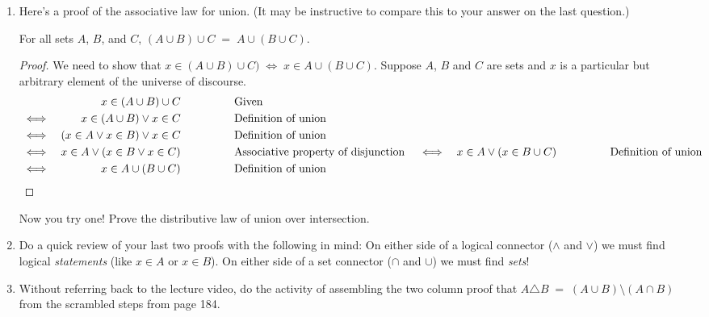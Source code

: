 \documentclass{amsart}
\begin{document}
\begin{enumerate}
Write a proof of the associative property for intersection.

\vfill

\vfill

\newpage

\item Here's a proof of the associative law for union. (It may be instructive to compare this to your answer on the last question.)

\begin{thm*}
For all sets $A$, $B$, and $C$, $(A \cup B) \cup C \; = \; A \cup (B \cup C)$.
\end{thm*}

\begin{proof}
We need to show that $x \in (A \cup B) \cup C) \; \iff \; x \in A \cup (B \cup C)$. Suppose $A$, $B$ and $C$ are sets and $x$ is a particular but arbitrary element of
the universe of discourse.
\begin{align*}
 &      & x \in (A \cup B) \cup C \rule{48pt}{0pt} & \mbox{Given} & \\
 & \iff & x \in (A \cup B) \lor x \in C \rule{48pt}{0pt}  & \mbox{Definition of union} & \\
 & \iff & (x \in A \lor x \in B) \lor x \in C \rule{48pt}{0pt}  & \mbox{Definition of union} & \\
 & \iff & x \in A \lor (x \in B \lor x \in C) \rule{48pt}{0pt}  & \mbox{Associative property of disjunction} & 
 & \iff & x \in A \lor (x \in B \cup C) \rule{48pt}{0pt}  & \mbox{Definition of union} & \\
  & \iff & x \in A \cup (B \cup C) \rule{48pt}{0pt}  & \mbox{Definition of union} & 
\end{align*}
\end{proof}

Now you try one! Prove the distributive law of union over intersection.

\vfill


\newpage
\item Do a quick review of your last two proofs with the following in mind:  On either side of a logical connector ($\land$ and $\lor$) we must find logical {\em statements} (like $x \in A$ or $x \in B$).  On either side of a set connector ($\cap$ and $\cup$) we must find {\em sets}!  

\vfill

\item Without referring back to the lecture video, do the activity of assembling the two column proof that
$A \triangle B \; = \; (A \cup B) \setminus (A \cap B)$ from the scrambled steps from page 184.


\end{enumerate}
\end{document}

